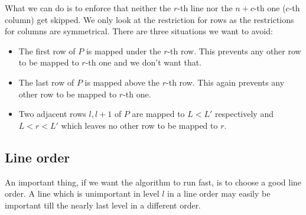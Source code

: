 What we can do is to enforce that neither the $r$-th line nor the $n+c$-th one ($c$-th column) get skipped. We only look at the restriction for rows as the restrictions for columns are symmetrical. There are three situations we want to avoid:
\begin{itemize}
\item The first row of $P$ is mapped under the $r$-th row. This prevents any other row to be mapped to $r$-th one and we don't want that.
\item The last row of $P$ is mapped above the $r$-th row. This again prevents any other row to be mapped to $r$-th one.
\item Two adjacent rows $l,l+1$ of $P$ are mapped to $L<L'$ respectively and $L<r<L'$ which leaves no other row to be mapped to $r$.
\end{itemize}

\subsection{Line order}
\label{sect:order}
An important thing, if we want the algorithm to run fast, is to choose a good line order. A line which is unimportant in level $l$ in a line order may easily be important till the nearly last level in a different order.

